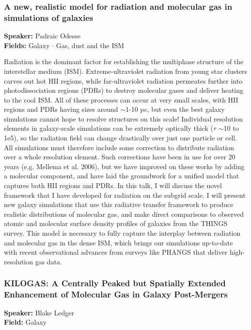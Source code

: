 \hypertarget{abstract-talk-187}{}\label{abstract-page-talk-187}
\subsubsection*{A new, realistic model for radiation and molecular gas in simulations of galaxies}
\textbf{Speaker:} Padraic Odesse\\
\textbf{Fields:} Galaxy $\cdot$ Gas, dust and the ISM

Radiation is the dominant factor for establishing the multiphase structure of the interstellar medium (ISM). Extreme-ultraviolet radiation from young star clusters carves out hot HII regions, while far-ultraviolet radiation permeates further into photodissociation regions (PDRs) to destroy molecular gases and deliver heating to the cool ISM. All of these processes can occur at very small scales, with HII regions and PDRs having sizes around $\sim$1-10 pc, but even the best galaxy simulations cannot hope to resolve structures on this scale! Individual resolution elements in galaxy-scale simulations can be extremely optically thick ($\tau$ $\sim$10 to 1e5), so the radiation field can change drastically over just one particle or cell. All simulations must therefore include some correction to distribute radiation over a whole resolution element. Such corrections have been in use for over 20 years (e.g. Mellema et al. 2006), but we have improved on these works by adding a molecular component, and have laid the groundwork for a unified model that captures both HII regions and PDRs. In this talk, I will discuss the novel framework that I have developed for radiation on the subgrid scale. I will present new galaxy simulations that use this radiative transfer framework to produce realistic distributions of molecular gas, and make direct comparisons to observed atomic and molecular surface density profiles of galaxies from the THINGS survey. This model is necessary to fully capture the interplay between radiation and molecular gas in the dense ISM, which brings our simulations up-to-date with recent observational advances from surveys like PHANGS that deliver high-resolution gas data.

\hypertarget{abstract-talk-222}{}\label{abstract-page-talk-222}
\subsubsection*{KILOGAS: A Centrally Peaked but Spatially Extended Enhancement of Molecular Gas in Galaxy Post-Mergers}
\textbf{Speaker:} Blake Ledger\\
\textbf{Field:} Galaxy

